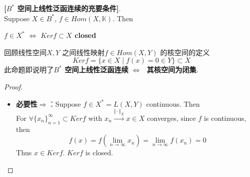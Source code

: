 	\begin{proposition}\label{prop 4.1.2}
		\textbf{[$B^*$ 空间上线性泛函连续的充要条件]}. \\
		Suppose $X \in B^*$, $f \in Hom(X , \mathbb{K})$. Then
		\begin{center}
			\textbf{$f \in X^* \,\, \Leftrightarrow \,\, Ker f \subset X$ closed}
		\end{center}
		
		\vspace*{2em}
		
		\begin{rmk}
			回顾线性空间$X , Y$ 之间线性映射$f \in Hom(X , Y)$ 的核空间的定义
			\[ Kerf = \{ x \in X \mid f(x) = 0 \in Y \} \subset X \]
			此命题即说明了\textbf{$B^*$ 空间上线性泛函连续$\,\, \Leftrightarrow \,\,$ 其核空间为闭集}. 
		\end{rmk}
		
		\vspace*{4em}
		
		\begin{proof}
			\begin{itemize}
				\item \textbf{必要性$\Rightarrow$}：Suppose $f \in X^* = L(X , Y)$ continuous. Then \\
				For $\forall \{ x_n \}_{n = 1}^{\infty} \subset Ker f$ with $x_n \overset{\Vert \cdot \Vert_X}{\to} x \in X$ converges, since $f$ is continuous, then
				\[ f(x) = f \left( \lim_{n \to \infty} x_n \right) = \lim_{n \to \infty} f(x_n) = 0 \]
				Thus $x \in Ker f$. $Ker f$ is closed. 
				
				\vspace*{6em}
				

\end{itemize}
\end{proof}
\end{proposition}
